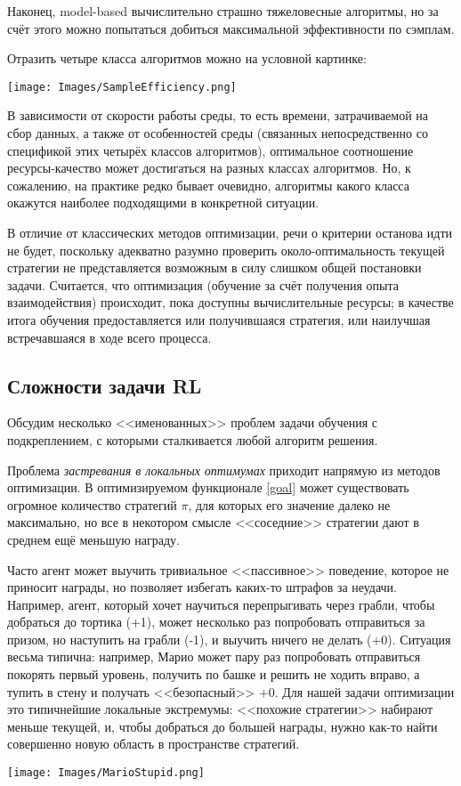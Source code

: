 Наконец, model-based вычислительно страшно тяжеловесные алгоритмы, но за счёт этого можно попытаться добиться максимальной эффективности по сэмплам. 

Отразить четыре класса алгоритмов можно на условной картинке:

\begin{center}
    \texttt{[image: Images/SampleEfficiency.png]}
\end{center}

В зависимости от скорости работы среды, то есть времени, затрачиваемой на сбор данных, а также от особенностей среды (связанных непосредственно со спецификой этих четырёх классов алгоритмов), оптимальное соотношение ресурсы-качество может достигаться на разных классах алгоритмов. Но, к сожалению, на практике редко бывает очевидно, алгоритмы какого класса окажутся наиболее подходящими в конкретной ситуации.

В отличие от классических методов оптимизации, речи о критерии останова идти не будет, поскольку адекватно разумно проверить около-оптимальность текущей стратегии не представляется возможным в силу слишком общей постановки задачи. Считается, что оптимизация (обучение за счёт получения опыта взаимодействия) происходит, пока доступны вычислительные ресурсы; в качестве итога обучения предоставляется или получившаяся стратегия, или наилучшая встречавшаяся в ходе всего процесса.

\subsection{Сложности задачи RL}\label{RLproblems}

Обсудим несколько <<именованных>> проблем задачи обучения с подкреплением, с которыми сталкивается любой алгоритм решения.

Проблема \emph{застревания в локальных оптимумах} приходит напрямую из методов оптимизации. В оптимизируемом функционале \eqref{goal} может существовать огромное количество стратегий $\pi$, для которых его значение далеко не максимально, но все в некотором смысле <<соседние>> стратегии дают в среднем ещё меньшую награду.

\begin{exampleBox}[righthand ratio=0.25, sidebyside, sidebyside align=center, lower separated=false]{}
Часто агент может выучить тривиальное <<пассивное>> поведение, которое не приносит награды, но позволяет избегать каких-то штрафов за неудачи. Например, агент, который хочет научиться перепрыгивать через грабли, чтобы добраться до тортика (+1), может несколько раз попробовать отправиться за призом, но наступить на грабли (-1), и выучить ничего не делать (+0). Ситуация весьма типична: например, Марио может пару раз попробовать отправиться покорять первый уровень, получить по башке и решить не ходить вправо, а тупить в стену и получать <<безопасный>> +0. Для нашей задачи оптимизации это типичнейшие локальные экстремумы: <<похожие стратегии>> набирают меньше текущей, и, чтобы добраться до большей награды, нужно как-то найти совершенно новую область в пространстве стратегий.

\tcblower
\texttt{[image: Images/MarioStupid.png]}
\end{exampleBox}

